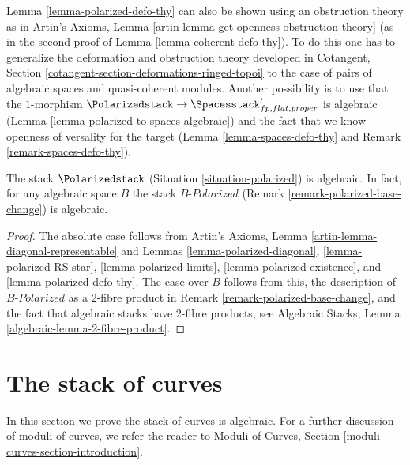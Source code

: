 \begin{remark}
\label{remark-polarized-defo-thy}
Lemma \ref{lemma-polarized-defo-thy} can also be shown
using an obstruction theory as in
Artin's Axioms, Lemma \ref{artin-lemma-get-openness-obstruction-theory}
(as in the second proof of Lemma \ref{lemma-coherent-defo-thy}).
To do this one has to generalize the deformation and obstruction theory
developed in
Cotangent, Section \ref{cotangent-section-deformations-ringed-topoi}
to the case of pairs of algebraic spaces and quasi-coherent modules.
Another possibility is to use that the $1$-morphism
$\Polarizedstack \to \Spacesstack'_{fp, flat, proper}$
is algebraic (Lemma \ref{lemma-polarized-to-spaces-algebraic})
and the fact that we know openness of versality for the target
(Lemma \ref{lemma-spaces-defo-thy} and
Remark \ref{remark-spaces-defo-thy}).
\end{remark}

\begin{theorem}
\label{theorem-polarized-algebraic}
The stack $\Polarizedstack$ (Situation \ref{situation-polarized})
is algebraic. In fact, for any algebraic space $B$ the stack
$B\textit{-Polarized}$ (Remark \ref{remark-polarized-base-change})
is algebraic.
\end{theorem}

\begin{proof}
The absolute case follows from
Artin's Axioms, Lemma \ref{artin-lemma-diagonal-representable}
and Lemmas \ref{lemma-polarized-diagonal},
\ref{lemma-polarized-RS-star},
\ref{lemma-polarized-limits},
\ref{lemma-polarized-existence}, and
\ref{lemma-polarized-defo-thy}.
The case over $B$ follows from this, the description of
$B\textit{-Polarized}$ as a $2$-fibre product in
Remark \ref{remark-polarized-base-change}, and the fact
that algebraic stacks have $2$-fibre products, see
Algebraic Stacks, Lemma \ref{algebraic-lemma-2-fibre-product}.
\end{proof}











\section{The stack of curves}
\label{section-curves}

\noindent
In this section we prove the stack of curves is algebraic. For
a further discussion of moduli of curves, we refer the reader
to Moduli of Curves, Section \ref{moduli-curves-section-introduction}.

